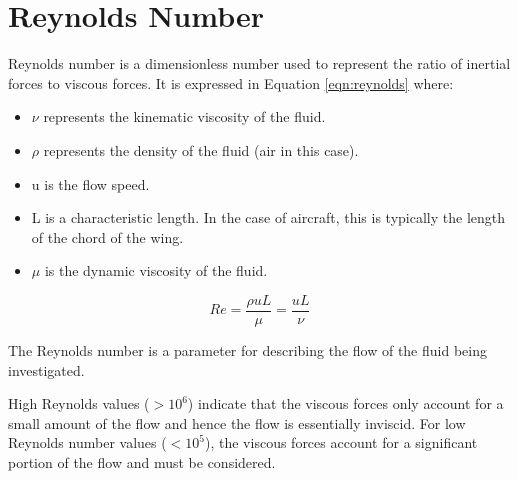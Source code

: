 \section{Reynolds Number}
Reynolds number is a dimensionless number used to represent the ratio of inertial forces to viscous forces. It is expressed in Equation \ref{eqn:reynolds} where:

\begin{itemize}
    \item $\nu$ represents the kinematic viscosity of the fluid.
    \item $\rho$ represents the density of the fluid (air in this case).
    \item u is the flow speed.
    \item L is a characteristic length. In the case of aircraft, this is typically the length of the chord of the wing.
    \item $\mu$ is the dynamic viscosity of the fluid.
\end{itemize} 

\begin{equation}
    Re = \frac{\rho uL}{\mu} = \frac{uL}{\nu}
    \label{eqn:reynolds}
\end{equation}


The Reynolds number is a parameter for describing the flow of the fluid being investigated.





High Reynolds values ($> 10^{6}$) indicate that the viscous forces only account for a small amount of the flow and hence the flow is essentially inviscid. For low Reynolds number values ($< 10^{5}$), the viscous forces account for a significant portion of the flow and must be considered.




